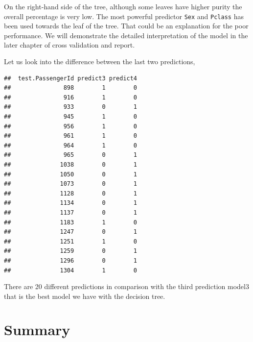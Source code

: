 \documentclass[
]{book}
\newenvironment{Shaded}{\begin{snugshade}}{\end{snugshade}}
\newcommand{\CommentTok}[1]{\textcolor[rgb]{0.56,0.35,0.01}{\textit{#1}}}
\newcommand{\DataTypeTok}[1]{\textcolor[rgb]{0.13,0.29,0.53}{#1}}
\newcommand{\DecValTok}[1]{\textcolor[rgb]{0.00,0.00,0.81}{#1}}
\newcommand{\KeywordTok}[1]{\textcolor[rgb]{0.13,0.29,0.53}{\textbf{#1}}}
\newcommand{\NormalTok}[1]{#1}
\newcommand{\OperatorTok}[1]{\textcolor[rgb]{0.81,0.36,0.00}{\textbf{#1}}}
\newcommand{\OtherTok}[1]{\textcolor[rgb]{0.56,0.35,0.01}{#1}}
\newcommand{\StringTok}[1]{\textcolor[rgb]{0.31,0.60,0.02}{#1}}
\begin{document}
On the right-hand side of the tree, although some leaves have higher purity the overall percentage is very low. The most powerful predictor \texttt{Sex} and \texttt{Pclass} has been used towards the leaf of the tree. That could be an explanation for the poor performance. We will demonstrate the detailed interpretation of the model in the later chapter of cross validation and report.

Let us look into the difference between the last two predictions,

\begin{Shaded}
\end{Shaded}

\begin{verbatim}
##  test.PassengerId predict3 predict4
##               898        1        0
##               916        1        0
##               933        0        1
##               945        1        0
##               956        1        0
##               961        1        0
##               964        1        0
##               965        0        1
##              1038        0        1
##              1050        0        1
##              1073        0        1
##              1128        0        1
##              1134        0        1
##              1137        0        1
##              1183        1        0
##              1247        0        1
##              1251        1        0
##              1259        0        1
##              1296        0        1
##              1304        1        0
\end{verbatim}

There are 20 different predictions in comparison with the third prediction model3 that is the best model we have with the decision tree.

\hypertarget{summary-6}{%
\section*{Summary}\label{summary-6}}
\end{document}
